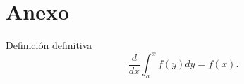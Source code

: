\chapter{Anexo}
\lipsum[1-3]
\begin{defn} Definición definitiva $$\frac{d}{dx}\int_a^xf(y)dy=f(x).$$\end{defn}